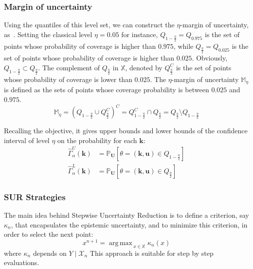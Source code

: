 \documentclass[a4paper,11pt]{article}
\newcommand{\Prob}{\mathbb{P}}
\newcommand{\Xspace}{\mathbb{X}}
\DeclareMathOperator*{\argmax}{arg\,max \,}
\theoremstyle{defi}
\numberwithin{thmCounter}{section}
\begin{document}
\subsubsection{Margin of uncertainty}
\label{sec:margin_of_uncertainty}
Using the quantiles of this level set, we can construct the $\eta$-margin of uncertainty, as~\cite{dubourg_reliability-based_2011}.
Setting the classical level $\eta=0.05$ for instance, $Q_{1-\frac{\eta}{2}}=Q_{0.975}$ is the set of points whose probability of coverage is higher than $0.975$, while $Q_{\frac{\eta}{2}}=Q_{0.025}$ is the set of points whose probability of coverage is higher than $0.025$. Obviously, $Q_{1-\frac{\eta}{2}} \subset Q_{\frac{\eta}{2}}$. The complement of $Q_{\frac{\eta}{2}}$ in $\Xspace$, denoted by $Q_{\frac{\eta}{2}}^C$ is the set of points whose probability of coverage is lower than $0.025$. The $\eta$-margin of uncertainty $\mathbb{M}_{\eta}$ is defined as the sets of points whose coverage probability is between $0.025$ and $0.975$.
\begin{equation*}
  \mathbb{M}_{\eta} = \left(Q_{1-\frac{\eta}{2}} \cup Q^C_{\frac{\eta}{2}} \right)^C = Q_{1-\frac{\eta}{2}}^C \cap Q_{\frac{\eta}{2}} = Q_{\frac{\eta}{2}} \setminus Q_{1-\frac{\eta}{2}}
\end{equation*}


Recalling the objective, it gives upper bounds and lower bounds of the confidence interval of level $\eta$ on the probability for each $\mathbf{k}$:
\begin{align}
  \hat{\Gamma}_{\alpha}^{U}(\mathbf{k}) &= \Prob_\mathbf{U}\left[\theta=(\mathbf{k},\mathbf{u}) \in Q_{1-\frac{\eta}{2}}\right] \\
  \hat{\Gamma}_{\alpha}^{L}(\mathbf{k}) &= \Prob_\mathbf{U}\left[\theta=(\mathbf{k},\mathbf{u}) \in Q_{\frac{\eta}{2}}\right]
\end{align}



\subsubsection{SUR Strategies}
The main idea behind Stepwise Uncertainty Reduction is to define a criterion, say $\kappa_n$, that encapsulates the epistemic uncertainty, and to minimize this criterion, in order to select the next point:
\begin{equation}
  x^{n+1} = \argmax_{x\in\Xspace} \kappa_n(x)
\end{equation}
where $\kappa_n$ depends on $Y\mid \mathcal{X}_n$
This approach is suitable for step by step evaluations.
\end{document}
